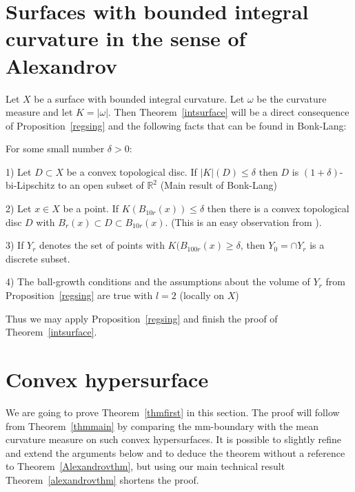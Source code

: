 \documentclass[12pt,leqno]{amsart}
\numberwithin{equation}{section}
\theoremstyle{definition}
\theoremstyle{remark}
\newcommand{\tref}[1]{Theorem~\ref{#1}}
\newcommand{\pref}[1]{Proposition~\ref{#1}}
\newcommand{\R}{\mathbb{R}}
\begin{document}





\section{Surfaces with bounded integral curvature in the sense of Alexandrov} \label{sec:surface}
Let $X$ be a  surface with bounded integral curvature. Let $\omega$ be the curvature measure  and let $K=|\omega|$.  Then  \tref{intsurface} will be a direct consequence of \pref{regsing} and the following facts that can be found in Bonk-Lang:

 For some small number $\delta >0$:

1) Let $D\subset X$ be a convex topological disc. If $|K|(D) \leq \delta$
then $D$ is $(1+\delta )$-bi-Lipschitz to an open subset of $\R ^2$ (Main result of Bonk-Lang)

2) Let $x\in X$ be a point. If $K (B_{10r} (x)) \leq  \delta$ then there is
a convex topological disc $D$ with $B_r (x) \subset D \subset B_{10r} (x)$.  (This is an easy observation from \cite{Bonk-Lang}).


3) If $Y_r$ denotes the set of points with $K( B_{100r} (x) \geq \delta$, then
$Y_0 = \cap Y_r$ is a discrete subset.

4) The ball-growth conditions and the assumptions about the volume of $Y_r$
from \pref{regsing}  are true with $l=2$ (locally on $X$)

Thus we may apply \pref{regsing} and finish the proof of \tref{intsurface}.


\section{Convex hypersurface}
We are going to prove \tref{thmfirst} in this section. The proof will follow from \tref{thmmain} by comparing the mm-boundary with the mean curvature measure on such convex hypersurfaces.
It is possible to slightly refine and extend  the arguments below and to deduce the theorem without a reference to \tref{Alexandrovthm}, but using  our main technical result \tref{alexandrovthm}
shortens the proof.
\end{document}

